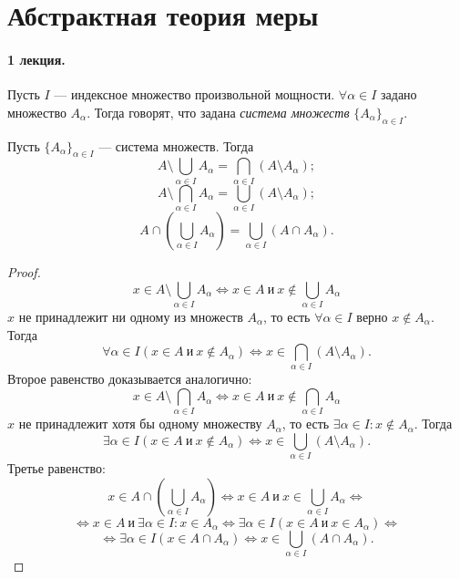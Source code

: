 \section{Абстрактная теория меры}
\paragraph{1 лекция.}
\begin{definition}
    Пусть $I$ — индексное множество произвольной мощности. $\forall \alpha \in I$ задано множество $A_{\alpha}$. Тогда говорят, что задана \textit{система множеств} $ \{ A_{\alpha} \}_{\alpha \in I} $.
\end{definition} 

\begin{lemma}
    Пусть $ \{ A_{\alpha} \}_{\alpha \in I} $ — система множеств. Тогда
    \[A \setminus \bigcup\limits_{\alpha \in I} A_{\alpha} = \bigcap\limits_{\alpha \in I} (A \setminus A_{\alpha});\]
    \[A \setminus \bigcap\limits_{\alpha \in I} A_{\alpha} = \bigcup\limits_{\alpha \in I} (A \setminus A_{\alpha});\]
    \[A \cap \left( \bigcup\limits_{\alpha \in I} A_{\alpha} \right) = \bigcup\limits_{\alpha \in I} (A \cap A_{\alpha}).\]
\end{lemma} 
\begin{proof}
    \[x \in A \setminus \bigcup\limits_{\alpha \in I} A_{\alpha} \Longleftrightarrow x \in A \ \text{и} \ x \notin \bigcup\limits_{\alpha \in I} A_{\alpha} \]
    $x$ не принадлежит ни одному из множеств $A_{\alpha}$, то есть $\forall \alpha \in I$ верно $x \notin A_{\alpha}$. Тогда 
    \[\forall \alpha \in I (x \in A \ \text{и} \ x \notin A_{\alpha}) \Longleftrightarrow x \in \bigcap\limits_{\alpha \in I} (A \setminus A_{\alpha}).\]
    Второе равенство доказывается аналогично:
    \[x \in A \setminus \bigcap\limits_{\alpha \in I} A_{\alpha} \Longleftrightarrow x \in A \ \text{и} \ x \notin \bigcap\limits_{\alpha \in I} A_{\alpha}\]
    $x$ не принадлежит хотя бы одному множеству $A_{\alpha}$, то есть $\exists \alpha \in I: x \notin A_{\alpha}$. Тогда
    \[\exists \alpha \in I (x \in A \ \text{и} \ x \notin A_{\alpha}) \Longleftrightarrow x \in \bigcup\limits_{\alpha \in I} (A \setminus A_{\alpha}).\]
    Третье равенство:
    \[x \in A \cap \left( \bigcup\limits_{\alpha \in I} A_{\alpha} \right) \Longleftrightarrow x \in A \ \text{и} \ x \in \bigcup\limits_{\alpha \in I} A_{\alpha} \Longleftrightarrow\]
    \[\Longleftrightarrow x \in A \ \text{и} \ \exists \alpha \in I: x \in A_{\alpha} \Longleftrightarrow \exists \alpha \in I (x \in A \ \text{и} \ x \in A_{\alpha}) \Longleftrightarrow\]
    \[\Longleftrightarrow \exists \alpha \in I (x \in A \cap A_{\alpha}) \Longleftrightarrow x \in \bigcup\limits_{\alpha \in I} (A \cap A_{\alpha}).\]
\end{proof} 

